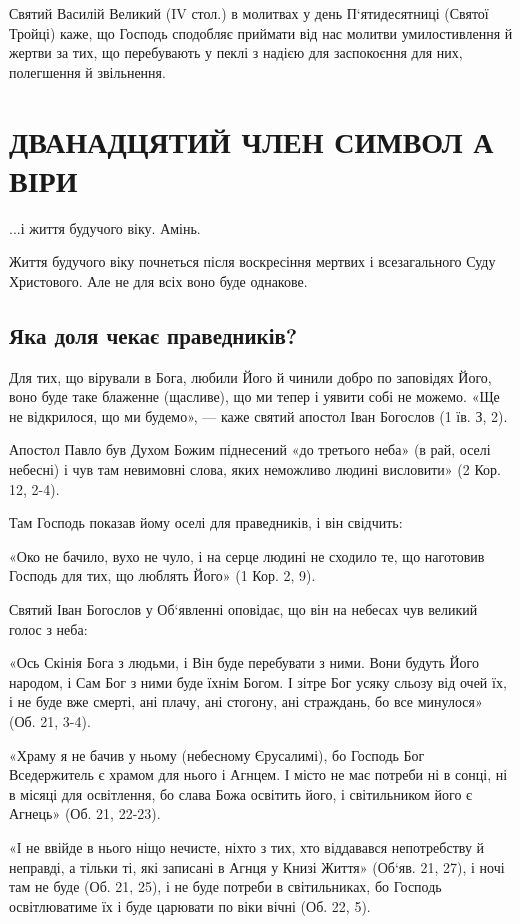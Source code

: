 \documentclass[main.tex]{subfiles}
\begin{document}
Святий Василій Великий (IV стол.) в молитвах у день П`ятидесятниці (Святої Тройці) каже, що Господь сподобляє приймати від нас молитви умилостивлення й жертви за тих, що перебувають у пеклі з надією для заспокоєння для них, полегшення й звільнення.

\section{ДВАНАДЦЯТИЙ ЧЛЕН СИМВОЛ А ВІРИ}

...і життя будучого віку. Амінь.

Життя будучого віку почнеться після воскресіння мертвих і всезагального Суду Христового. Але не для всіх воно буде однакове.

\subsection{Яка доля чекає праведників?}

Для тих, що вірували в Бога, любили Його й чинили добро по заповідях Його, воно буде таке блаженне (щасливе), що ми тепер і уявити собі не можемо. «Ще не відкрилося, що ми будемо», — каже святий апостол Іван Богослов (1 їв. З, 2).

Апостол Павло був Духом Божим піднесений «до третього неба» (в рай, оселі небесні) і чув там невимовні слова, яких неможливо людині висловити» (2 Кор. 12, 2-4).

Там Господь показав йому оселі для праведників, і він свідчить:

«Око не бачило, вухо не чуло, і на серце людині не сходило те, що наготовив Господь для тих, що люблять Його» (1 Кор. 2, 9).

Святий Іван Богослов у Об`явленні оповідає, що він на небесах чув великий голос з неба:

«Ось Скінія Бога з людьми, і Він буде перебувати з ними. Вони будуть Його народом, і Сам Бог з ними буде їхнім Богом. І зітре Бог усяку сльозу від очей їх, і не буде вже смерті, ані плачу, ані стогону, ані страждань, бо все минулося» (Об. 21, 3-4).

«Храму я не бачив у ньому (небесному Єрусалимі), бо Господь Бог Вседержитель є храмом для нього і Агнцем. І місто не має потреби ні в сонці, ні в місяці для освітлення, бо слава Божа освітить його, і світильником його є Агнець» (Об. 21, 22-23).

«І не ввійде в нього ніщо нечисте, ніхто з тих, хто віддавався непотребству й неправді, а тільки ті, які записані в Агнця у Книзі Життя» (Об`яв. 21, 27), і ночі там не буде (Об. 21, 25), і не буде потреби в світильниках, бо Господь освітлюватиме їх і буде царювати по віки вічні (Об. 22, 5).
\end{document}

